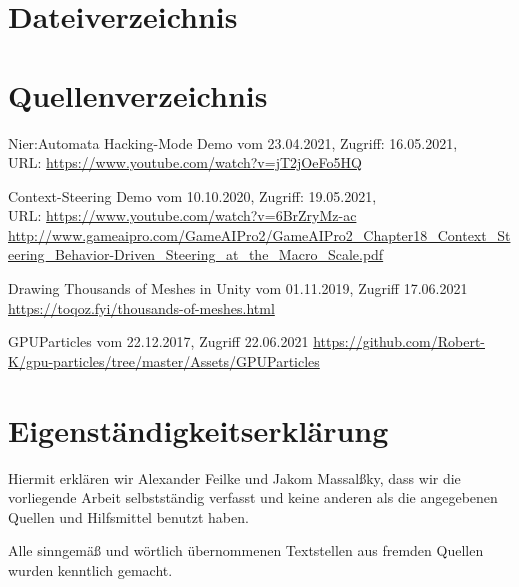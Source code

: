 \documentclass[a4paper,ngerman,12pt]{report}
\begin{document}
\chapter{Dateiverzeichnis}




\chapter{Quellenverzeichnis}

\begin{thebibliography}{999}

 Nier:Automata Hacking-Mode Demo vom 23.04.2021,  Zugriff:  16.05.2021, \\ URL:
\url{https://www.youtube.com/watch?v=jT2jOeFo5HQ}

 Context-Steering Demo vom 10.10.2020,  Zugriff:  19.05.2021, \\ URL:
\url{https://www.youtube.com/watch?v=6BrZryMz-ac}
\url{http://www.gameaipro.com/GameAIPro2/GameAIPro2_Chapter18_Context_Steering_Behavior-Driven_Steering_at_the_Macro_Scale.pdf}

 Drawing Thousands of Meshes in Unity vom 01.11.2019, Zugriff 17.06.2021
\url{https://toqoz.fyi/thousands-of-meshes.html}

 GPUParticles vom 22.12.2017, Zugriff 22.06.2021
\url{https://github.com/Robert-K/gpu-particles/tree/master/Assets/GPUParticles}

\end{thebibliography}
    




\chapter{Eigenständigkeitserklärung}

Hiermit erklären wir Alexander Feilke und Jakom Massal{\ss}ky, dass wir die vorliegende Arbeit selbstständig verfasst und keine anderen als die angegebenen Quellen und Hilfsmittel benutzt haben.

Alle sinngemä{\ss} und wörtlich übernommenen Textstellen aus fremden Quellen wurden kenntlich gemacht.
\end{document}
